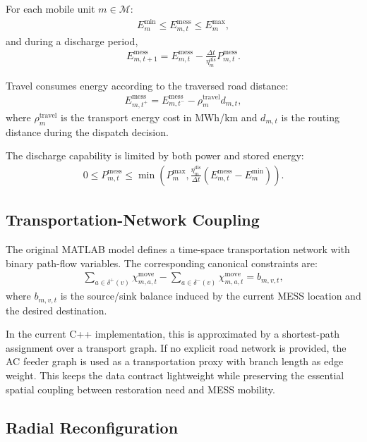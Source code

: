 For each mobile unit $m\in\mathcal{M}$:
\begin{align}
E^{\min}_{m} \le E^{\mathrm{mess}}_{m,t} \le E^{\max}_{m},
\end{align}
and during a discharge period,
\begin{align}
E^{\mathrm{mess}}_{m,t+1}
= E^{\mathrm{mess}}_{m,t}
- \frac{\Delta t}{\eta^{\mathrm{dis}}_{m}} P^{\mathrm{mess}}_{m,t}.
\end{align}

Travel consumes energy according to the traversed road distance:
\begin{align}
E^{\mathrm{mess}}_{m,t^{+}}
= E^{\mathrm{mess}}_{m,t^{-}} - \rho^{\mathrm{travel}}_m d_{m,t},
\end{align}
where $\rho^{\mathrm{travel}}_m$ is the transport energy cost in MWh/km and
$d_{m,t}$ is the routing distance during the dispatch decision.

The discharge capability is limited by both power and stored energy:
\begin{align}
0 \le P^{\mathrm{mess}}_{m,t}
\le \min\left(P^{\max}_{m},
\frac{\eta^{\mathrm{dis}}_{m}}{\Delta t}
\left(E^{\mathrm{mess}}_{m,t} - E^{\min}_{m}\right)\right).
\end{align}

\subsection{Transportation-Network Coupling}

The original MATLAB model defines a time-space transportation network with
binary path-flow variables. The corresponding canonical constraints are:
\begin{align}
\sum_{a\in\delta^{+}(v)} \chi^{\mathrm{move}}_{m,a,t}
- \sum_{a\in\delta^{-}(v)} \chi^{\mathrm{move}}_{m,a,t}
= b_{m,v,t},
\end{align}
where $b_{m,v,t}$ is the source/sink balance induced by the current MESS
location and the desired destination.

In the current C++ implementation, this is approximated by a shortest-path
assignment over a transport graph. If no explicit road network is provided, the
AC feeder graph is used as a transportation proxy with branch length as edge
weight. This keeps the data contract lightweight while preserving the essential
spatial coupling between restoration need and MESS mobility.

\subsection{Radial Reconfiguration}

